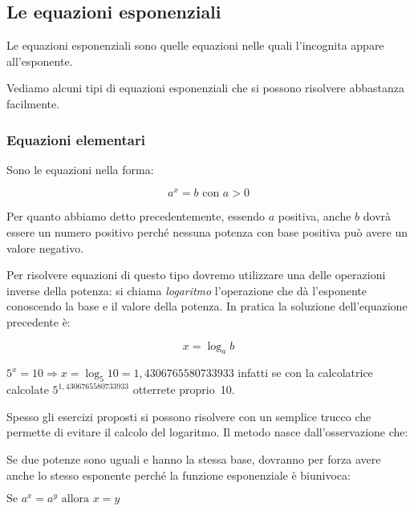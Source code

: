 \subsection{Le equazioni esponenziali}
\label{subsec:esplog_equazioniesponenziali}

\begin{definizione}{
Le equazioni esponenziali
sono quelle equazioni nelle quali l'incognita appare all'esponente.
}
\end{definizione}

Vediamo alcuni tipi di equazioni esponenziali che si possono risolvere 
abbastanza facilmente.

\subsubsection{Equazioni elementari}
\label{subsubsec:esplog_eq_elementari}

Sono le equazioni nella forma:

\[a^x=b \text{ con } a>0\]

Per quanto abbiamo detto precedentemente, essendo \(a\) positiva, anche \(b\) 
dovrà essere un numero positivo perché nessuna potenza con base positiva può 
avere un valore negativo.

Per risolvere equazioni di questo tipo dovremo utilizzare una delle 
operazioni inverse della potenza: si chiama \emph{logaritmo} l'operazione che 
dà l'esponente conoscendo la base e il valore della potenza. 
In pratica la soluzione dell'equazione precedente è:

\[x = \log_a b\]

\begin{esempio}
\(5^x=10 \Rightarrow x=\log_5 10 = 1,4306765580733933\)
infatti se con la calcolatrice calcolate \(5^{1,4306765580733933}\) 
otterrete proprio~10.
\end{esempio}

Spesso gli esercizi proposti si possono risolvere con un semplice trucco che 
permette di evitare il calcolo del logaritmo. 
Il metodo nasce dall'osservazione che:

\begin{osservazione}
 Se due potenze sono uguali e hanno la stessa base, dovranno per 
forza avere anche lo stesso esponente perché la funzione esponenziale è 
biunivoca: 

\(\text{Se } a^x = a^y \text{ allora } x=y\)
\end{osservazione}

